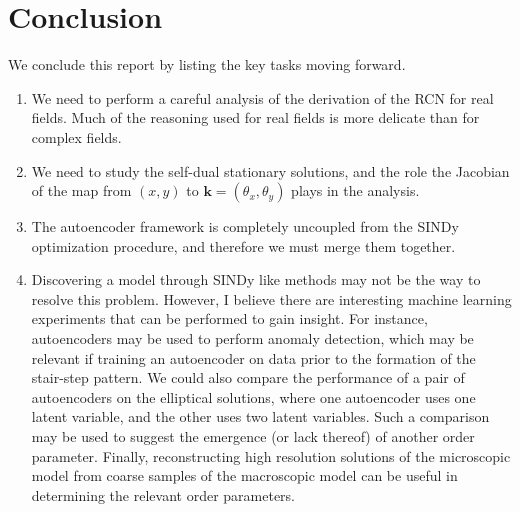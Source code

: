 \documentclass[12pt]{article}
\numberwithin{equation}{section}
\begin{document}
\section{Conclusion}
\par We conclude this report by listing the key tasks moving forward.
\begin{enumerate}
    \item We need to perform a careful analysis of the derivation of the RCN for real fields. Much of the reasoning used for real fields is more delicate than for complex fields.
    \item We need to study the self-dual stationary solutions, and the role the Jacobian of the map from $(x,y)$ to $\bm{k}=(\theta_x,\theta_y)$ plays in the analysis.
    \item The autoencoder framework is completely uncoupled from the SINDy optimization procedure, and therefore we must merge them together.
    \item Discovering a model through SINDy like methods may not be the way to resolve this problem. However, I believe there are interesting machine learning experiments that can be performed to gain insight. For instance, autoencoders may be used to perform anomaly detection, which may be relevant if training an autoencoder on data prior to the formation of the stair-step pattern. We could also compare the performance of a pair of autoencoders on the elliptical solutions, where one autoencoder uses one latent variable, and the other uses two latent variables. Such a comparison may be used to suggest the emergence (or lack thereof) of another order parameter. Finally, reconstructing high resolution solutions of the microscopic model from coarse samples of the macroscopic model can be useful in determining the relevant order parameters.
\end{enumerate}
\end{document}
